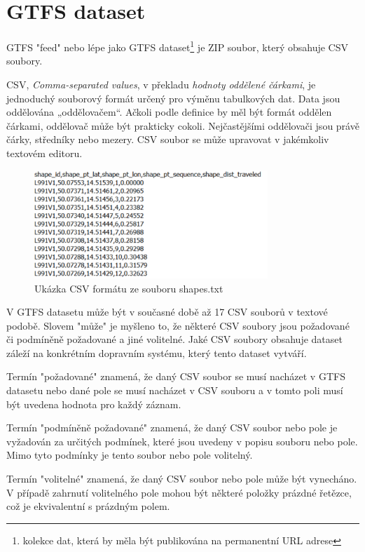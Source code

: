 
\section{GTFS dataset}
GTFS "feed" nebo lépe jako GTFS dataset\footnote{kolekce dat, která by měla být publikována na permanentní URL adrese}
je ZIP soubor, který obsahuje CSV soubory.

CSV, \textit{Comma-separated values}, v překladu \textit{hodnoty oddělené čárkami}, je jednoduchý 
souborový formát určený pro výměnu tabulkových dat. Data jsou oddělována „oddělovačem“.
Ačkoli podle definice by měl být formát oddělen čárkami, oddělovač může být prakticky cokoli. 
Nejčastějšími oddělovači jsou právě čárky, středníky nebo mezery. CSV soubor se 
může upravovat v jakémkoliv textovém editoru.

\begin{figure}[H] \centering
    \includegraphics[width=250pt]{./pictures/ukazka-csv.PNG}
    \caption[Ukázka CSV formátu ze souboru shapes.txt]{Ukázka CSV formátu ze souboru shapes.txt}
	\label{fig:ukazka-csv}              
\end{figure}

V GTFS datasetu může být v současné době až 17 CSV souborů v textové podobě. Slovem "může" je myšleno to,
že některé CSV soubory jsou požadované či podmíněně požadované a jiné volitelné.
Jaké CSV soubory obsahuje dataset záleží na konkrétním dopravním systému, který
tento dataset vytváří.

Termín "požadované" znamená, že daný CSV soubor se musí nacházet v GTFS datasetu nebo dané pole
se musí nacházet v CSV souboru a v tomto poli musí být uvedena hodnota pro každý záznam. 

Termín "podmíněně požadované" znamená, že daný CSV soubor nebo pole je vyžadován za určitých podmínek, 
které jsou uvedeny v popisu souboru nebo pole. Mimo tyto podmínky je tento soubor nebo pole volitelný.

Termín "volitelné" znamená, že daný CSV soubor nebo pole může být vynecháno. V případě zahrnutí 
volitelného pole mohou být některé položky prázdné řetězce, což je ekvivalentní s prázdným
polem.

